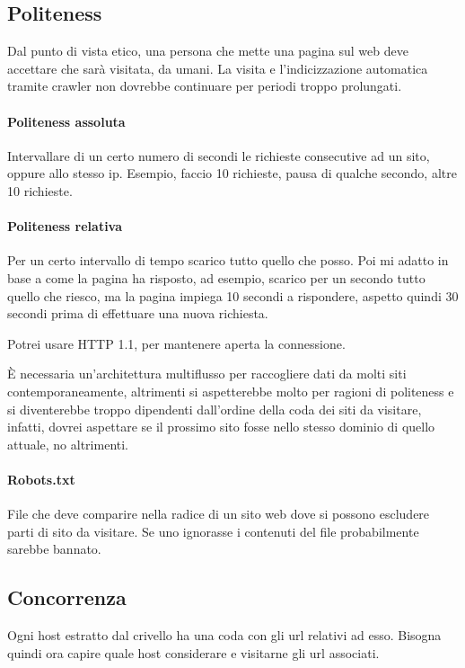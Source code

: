 \subsection{Politeness}

Dal punto di vista etico, una persona che mette una pagina sul web 
deve accettare che sarà visitata, da umani. 
La visita e l'indicizzazione automatica tramite crawler non dovrebbe 
continuare per periodi troppo prolungati.

\paragraph{Politeness assoluta}
Intervallare di un certo numero di secondi le richieste consecutive ad 
un sito, oppure allo stesso ip. Esempio, faccio 10 richieste, pausa di qualche secondo, altre 10 richieste.

\paragraph{Politeness relativa}
Per un certo intervallo di tempo scarico tutto quello che posso. Poi mi 
adatto in base a come la pagina ha risposto, ad esempio, 
scarico per un secondo tutto quello che riesco, ma la pagina impiega 
10 secondi a rispondere, aspetto quindi 30 secondi prima di effettuare 
una nuova richiesta.

Potrei usare HTTP 1.1, per mantenere aperta la connessione. 

\begin{remark}
    È necessaria un'architettura multiflusso per raccogliere dati 
    da molti siti contemporaneamente, altrimenti si aspetterebbe molto 
    per ragioni di politeness e si diventerebbe troppo dipendenti 
    dall'ordine della coda dei siti da visitare, infatti, dovrei aspettare 
    se il prossimo sito fosse nello stesso dominio di quello attuale, no altrimenti.
\end{remark}

\paragraph{Robots.txt}
File che deve comparire nella radice di un sito web dove si possono 
escludere parti di sito da visitare.
Se uno ignorasse i contenuti del file probabilmente sarebbe bannato. 

\subsection{Concorrenza}
Ogni host estratto dal crivello ha una coda con gli url relativi ad esso. 
Bisogna quindi ora capire quale host considerare e visitarne gli url associati.

